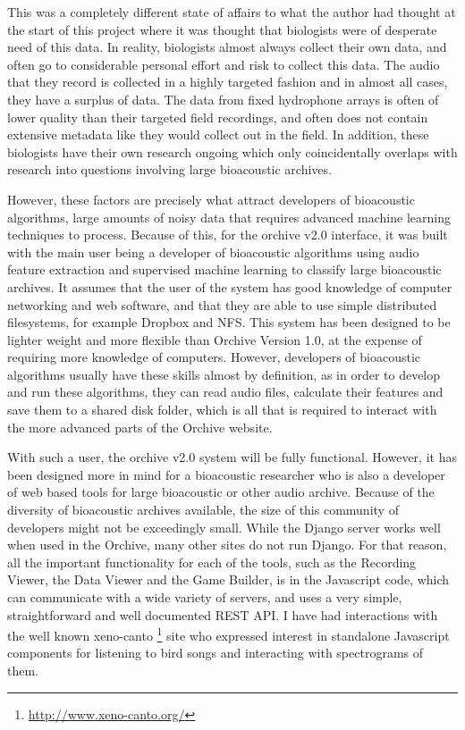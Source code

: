 \documentclass[12pt,oneside]{book}
\begin{document}
This was a completely different state of affairs to what the author
had thought at the start of this project where it was thought that
biologists were of desperate need of this data.  In reality,
biologists almost always collect their own data, and often go to
considerable personal effort and risk to collect this data.  The audio
that they record is collected in a highly targeted fashion and in
almost all cases, they have a surplus of data.  The data from fixed
hydrophone arrays is often of lower quality than their targeted field
recordings, and often does not contain extensive metadata like they
would collect out in the field.  In addition, these biologists have
their own research ongoing which only coincidentally overlaps with
research into questions involving large bioacoustic archives.

However, these factors are precisely what attract developers of
bioacoustic algorithms, large amounts of noisy data that requires
advanced machine learning techniques to process.  Because of this, for
the orchive v2.0 interface, it was built with the main user being a
developer of bioacoustic algorithms using audio feature extraction and
supervised machine learning to classify large bioacoustic archives.
It assumes that the user of the system has good knowledge of computer
networking and web software, and that they are able to use simple
distributed filesystems, for example Dropbox and NFS.  This system has
been designed to be lighter weight and more flexible than Orchive
Version 1.0, at the expense of requiring more knowledge of computers.
However, developers of bioacoustic algorithms usually have these
skills almost by definition, as in order to develop and run these
algorithms, they can read audio files, calculate their features and
save them to a shared disk folder, which is all that is required to
interact with the more advanced parts of the Orchive website. 

With such a user, the orchive v2.0 system will be fully functional.
However, it has been designed more in mind for a bioacoustic
researcher who is also a developer of web based tools for large
bioacoustic or other audio archive.  Because of the diversity of
bioacoustic archives available, the size of this community of
developers might not be exceedingly small.  While the Django server
works well when used in the Orchive, many other sites do not run
Django.  For that reason, all the important functionality for each of
the tools, such as the Recording Viewer, the Data Viewer and the Game
Builder, is in the Javascript code, which can communicate with a wide
variety of servers, and uses a very simple, straightforward and well
documented REST API.  I have had interactions with the well known
xeno-canto \footnote{\url{http://www.xeno-canto.org/}} site who
expressed interest in standalone Javascript components for listening
to bird songs and interacting with spectrograms of them.
\end{document}
